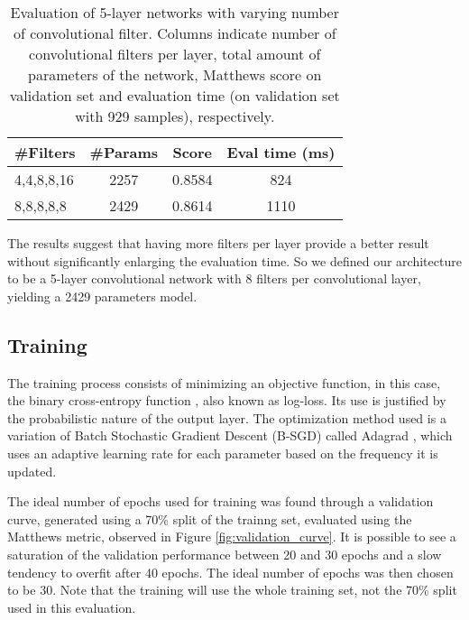         \begin{table}
      	 \begin{center}
      	  \label{table:evalNumberFilters}
      	  \caption{Evaluation of 5-layer networks with varying number of convolutional filter. Columns indicate number of convolutional filters per layer, total amount of parameters of the network, Matthews score on validation set and evaluation time (on validation set with 929 samples), respectively.}
      	  \begin{tabular}{ | l | c | c | c |}
      	    \hline
      	    \#Filters  & \#Params  &  Score   & Eval time (ms)   \\ \hline
      	    4,4,8,8,16 &   2257    &  0.8584  &    824           \\
      	    8,8,8,8,8  &   2429    &  0.8614  &    1110           \\ \hline
      		  \end{tabular}
      		\end{center}
      	 \end{table}

        The results suggest that having more filters per layer provide a better result without significantly enlarging the evaluation time. So we defined our architecture to be a 5-layer convolutional network with 8 filters per convolutional layer, yielding a 2429 parameters model.


    \subsection{Training}
        The training process consists of minimizing an objective function, in this case, the binary cross-entropy function \cite{DLbook}, also known as log-loss. Its use is justified by the probabilistic nature of the output layer. The optimization method used is a variation of Batch Stochastic Gradient Descent (B-SGD) called Adagrad \cite{duchi2011adaptive}, which uses an adaptive learning rate for each parameter based on the frequency it is updated.

        The ideal number of epochs used for training was found through a validation curve, generated using a 70\% split of the trainng set, evaluated using the Matthews metric, observed in Figure \ref{fig:validation_curve}. It is possible to see a saturation of the validation performance between 20 and 30 epochs and a slow tendency to overfit after 40 epochs. The ideal number of epochs was then chosen to be 30. Note that the training will use the whole training set, not the 70\% split used in this evaluation.

